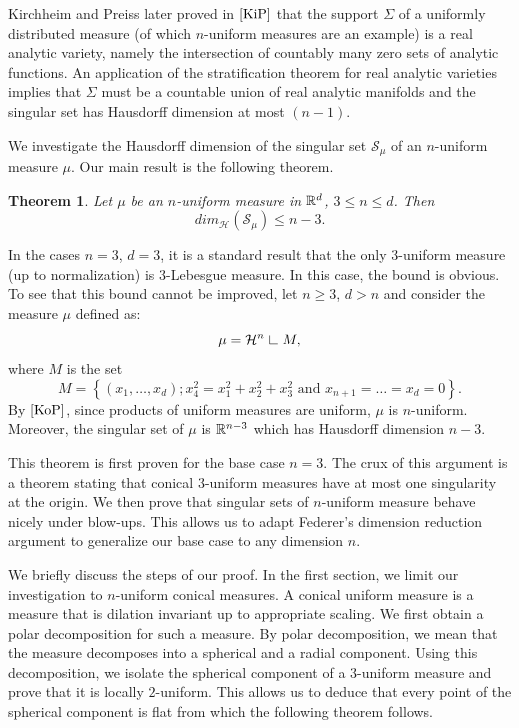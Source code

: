 \documentclass[11pt]{article}
\newtheorem{theorem}{Theorem}[section]
\theoremstyle{definition}
\theoremstyle{remark}
\numberwithin{equation}{section}
\newcommand{\res}{\hbox{{\vrule height .22cm}{\leaders\hrule\hskip .2cm}}}
\def\res{\hbox{ {\vrule height .22cm}{\leaders\hrule\hskip.2cm} } }
\begin{document}
Kirchheim and Preiss later proved in $\cite{KiP}$ that the support $\Sigma$ of a uniformly distributed measure (of which $n$-uniform measures are an example) is a real analytic variety, namely the intersection of countably many zero sets of analytic functions. An application of the stratification theorem for real analytic varieties implies that $\Sigma$ must be a countable union of real analytic manifolds and the singular set has Hausdorff dimension at most $(n-1)$.

We investigate the Hausdorff dimension of the singular set $\mathcal{S}_{\mu}$ of an $n$-uniform measure $\mu$. Our main result is the following theorem.






\begin{theorem} \label{maintheorem} Let $\mu$ be an $n$-uniform measure in $\mathbb{R}^{d}$, $ 3 \leq n \leq d$.
Then
$$dim_{\mathcal{H}}(\mathcal{S}_{\mu}) \leq n-3.$$
\end{theorem}
In the cases $n=3$, $d=3$, it is a standard result that the only $3$-uniform measure (up to normalization) is $3$-Lebesgue measure. In this case, the bound is obvious. 
To see that this bound cannot be improved, let $n\geq 3$, $d>n$ and consider the measure $\mu$ defined as:
\begin{equation}
\mu = \mathcal{H}^{n} \res M,
\end{equation}
where $M$ is the set
\begin{equation}
M=\left\lbrace (x_1, \ldots, x_d) ; x_4^2=x_1^2+x_2^2+x_3^2 \mbox{ and } x_{n+1}=\ldots = x_d =0 \right\rbrace.
\end{equation}
By $\cite{KoP}$, since products of uniform measures are uniform, $\mu$ is $n$-uniform. Moreover, the singular set of $\mu$ is $\mathbb{R}^{n-3}$ which has Hausdorff dimension $n-3$.


This theorem is first proven for the base case $n=3$. The crux of this argument is a theorem stating that conical $3$-uniform measures have at most one singularity at the origin. We then prove that singular sets of $n$-uniform measure behave nicely under blow-ups. This allows us to adapt Federer's dimension reduction argument to generalize our base case to any dimension $n$.



 
We briefly discuss the steps of our proof. In the first section, we limit our investigation to $n$-uniform conical measures. A conical uniform measure is a measure that is dilation invariant up to appropriate scaling. We first obtain a polar decomposition for such a measure. By polar decomposition, we mean that the measure decomposes into a spherical and a radial component. Using this decomposition, we isolate the spherical component of a $3$-uniform measure and prove that it is locally $2$-uniform. This allows us to deduce that every point of the spherical component is flat from which the following theorem follows.
\end{document}

